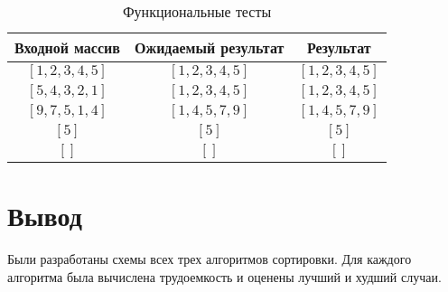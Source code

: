 \begin{table}[h]
	\begin{center}
		\begin{threeparttable}
		\captionsetup{justification=raggedleft,singlelinecheck=off}
		\caption{\label{tbl:functional_test} Функциональные тесты}
		\begin{tabular}{|c|c|c|}
			\hline
			Входной массив & Ожидаемый результат & Результат \\ 
			\hline
			$[1, 2, 3, 4, 5]$ & $[1, 2, 3, 4, 5]$  & $[1, 2, 3, 4, 5]$\\
			$[5, 4, 3, 2, 1]$  & $[1, 2, 3, 4, 5]$ & $[1, 2, 3, 4, 5]$\\
			$[9, 7, 5, 1, 4]$  & $[1, 4, 5, 7, 9]$  & $[1, 4, 5, 7, 9]$\\
			$[5]$  & $[5]$  & $[5]$\\
			$[]$  & $[]$  & $[]$\\
			\hline
		\end{tabular}
    \end{threeparttable}
	\end{center}
\end{table}


\section*{Вывод}

Были разработаны схемы всех трех алгоритмов сортировки. Для каждого алгоритма была вычислена трудоемкость и оценены лучший и худший случаи.
